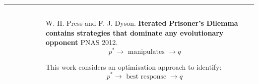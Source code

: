 \documentclass[usenames,dvipsnames,t]{beamer}
\newcommand{\R}{\mathbb{R}}
\begin{document}
\hrule height 3pt
\vspace{1cm}

\begin{columns}
    \begin{column}{.02\linewidth}
    \end{column}
    \begin{column}{.2\linewidth}
        \vspace{1cm}

        
    \end{column}
    \begin{column}{.3\linewidth}
    \vspace{-.5cm}
        \begin{center}
             \\
             \\
            
        \end{center}
    \end{column}
    \begin{column}{.1\linewidth}
        \vspace{2cm}

        
    \end{column}
    \begin{column}{.3\linewidth}
        \vspace{1cm}

        \small{
            W. H. Press and F. J. Dyson. \textbf{Iterated Prisoner's
            Dilemma contains strategies that dominate any evolutionary opponent}
            PNAS 2012.
            \[p ^ * \rightarrow \text{ manipulates } \rightarrow q\]
        }
        \vspace{1cm}

        \small{
        This work considers an optimisation approach to identify:
        \[ p ^ * \rightarrow \text{ best response } \rightarrow q\]}
        \normalsize{{
            \boldmath{\[u_q(p)= \frac{\frac{1}{2}\enspace p  Q  p^T + c^T p + a}
                  {\frac{1}{2}\enspace  p  \bar{Q}  p^T + \bar{c}^T  p + \bar{a}},
                  \text{ where }  \ p \in \R^4_{[0, 1]}\] 
            }}}
    \end{column}
    \begin{column}{.05\linewidth}
    \end{column}
\end{columns}
\vspace{1cm}
\end{document}

